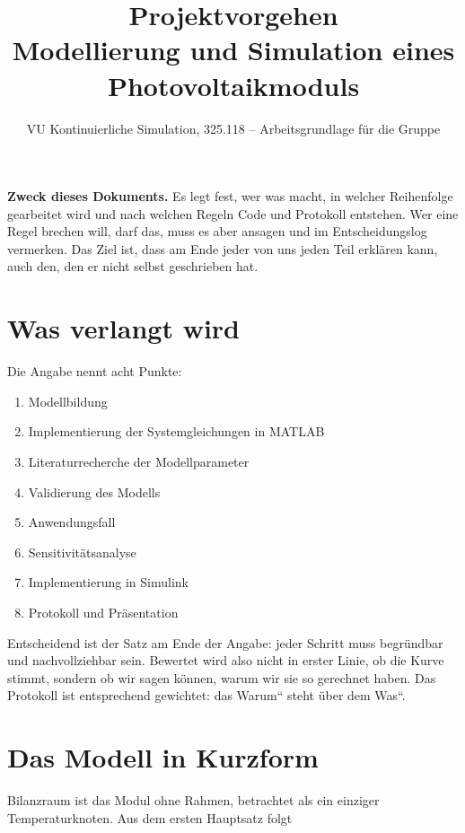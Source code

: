 \documentclass[11pt,a4paper]{scrartcl}
\title{Projektvorgehen\\[2mm]\large Modellierung und Simulation eines Photovoltaikmoduls}
\subtitle{VU Kontinuierliche Simulation, 325.118 -- Arbeitsgrundlage f\"ur die Gruppe}
\date{}
\author{}
\providecommand{\glqq}{\quotedblbase}
\providecommand{\grqq}{\textquotedblleft}
\begin{document}
\maketitle
\vspace{-12mm}
\tableofcontents
\bigskip

\begin{merke}
\textbf{Zweck dieses Dokuments.} Es legt fest, wer was macht, in welcher
Reihenfolge gearbeitet wird und nach welchen Regeln Code und Protokoll
entstehen. Wer eine Regel brechen will, darf das, muss es aber ansagen und
im Entscheidungslog vermerken. Das Ziel ist, dass am Ende jeder von uns
jeden Teil erkl\"aren kann, auch den, den er nicht selbst geschrieben hat.
\end{merke}

\section{Was verlangt wird}

Die Angabe nennt acht Punkte:

\begin{enumerate}[label=\arabic*.]
  \item Modellbildung
  \item Implementierung der Systemgleichungen in MATLAB
  \item Literaturrecherche der Modellparameter
  \item Validierung des Modells
  \item Anwendungsfall
  \item Sensitivit\"atsanalyse
  \item Implementierung in Simulink
  \item Protokoll und Pr\"asentation
\end{enumerate}

Entscheidend ist der Satz am Ende der Angabe: jeder Schritt muss
begr\"undbar und nachvollziehbar sein. Bewertet wird also nicht in erster
Linie, ob die Kurve stimmt, sondern ob wir sagen k\"onnen, warum wir sie so
gerechnet haben. Das Protokoll ist entsprechend gewichtet: das \glqq Warum\grqq{}
steht \"uber dem \glqq Was\grqq.

\section{Das Modell in Kurzform}

Bilanzraum ist das Modul ohne Rahmen, betrachtet als ein einziger
Temperaturknoten. Aus dem ersten Hauptsatz folgt
\end{document}
